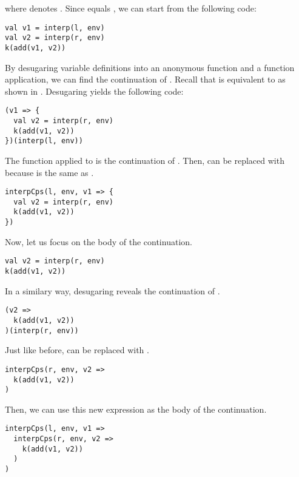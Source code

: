 where  denotes .
Since  equals , we can start
from the following code:

\begin{verbatim}
val v1 = interp(l, env)
val v2 = interp(r, env)
k(add(v1, v2))
\end{verbatim}

By desugaring variable definitions into an anonymous function and a function
application, we can find the continuation of .
Recall that  is equivalent to  as shown
in . Desugaring yields the following code:

\begin{verbatim}
(v1 => {
  val v2 = interp(r, env)
  k(add(v1, v2))
})(interp(l, env))
\end{verbatim}

The function applied to  is the continuation of
. Then,  can be replaced with
 because  is the same as
.

\begin{verbatim}
interpCps(l, env, v1 => {
  val v2 = interp(r, env)
  k(add(v1, v2))
})
\end{verbatim}

Now, let us focus on the body of the continuation.

\begin{verbatim}
val v2 = interp(r, env)
k(add(v1, v2))
\end{verbatim}

In a similary way, desugaring reveals the continuation of .

\begin{verbatim}
(v2 =>
  k(add(v1, v2))
)(interp(r, env))
\end{verbatim}

Just like before,  can be replaced with .

\begin{verbatim}
interpCps(r, env, v2 =>
  k(add(v1, v2))
)
\end{verbatim}

Then, we can use this new expression as the body of the continuation.

\begin{verbatim}
interpCps(l, env, v1 =>
  interpCps(r, env, v2 =>
    k(add(v1, v2))
  )
)
\end{verbatim}

